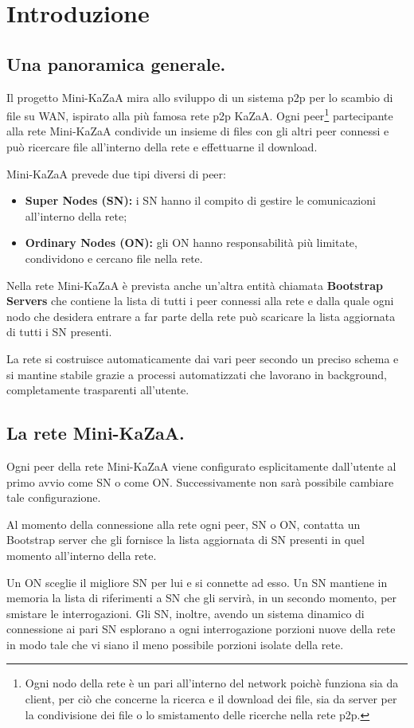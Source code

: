 \chapter{Introduzione}
\section{Una panoramica generale.}
Il progetto Mini-KaZaA mira allo sviluppo di un sistema p2p per lo scambio di file su WAN, ispirato alla più famosa
rete p2p KaZaA.
Ogni peer\footnote{Ogni nodo della rete è un pari all'interno del network poichè funziona sia da client, per ciò che concerne la ricerca e il download dei file, sia da server per la condivisione dei file o lo smistamento delle ricerche nella rete p2p.} partecipante alla rete Mini-KaZaA condivide un insieme di files con gli altri peer connessi e può ricercare file all'interno della rete e effettuarne il download.

Mini-KaZaA prevede due tipi diversi di peer:
\begin{itemize}
 \item \textbf{Super Nodes (SN): }i SN hanno il compito di gestire le comunicazioni all'interno della rete;
 \item \textbf{Ordinary Nodes (ON): }gli ON hanno responsabilità più limitate, condividono e cercano file nella rete.
\end{itemize}

Nella rete Mini-KaZaA è prevista anche un'altra entità chiamata \textbf{Bootstrap Servers} che contiene la lista di tutti i peer connessi alla rete e dalla quale ogni nodo che desidera entrare a far parte della rete può scaricare la lista aggiornata di tutti i SN presenti.

La rete si costruisce automaticamente dai vari peer secondo un preciso schema e si mantine stabile grazie a processi automatizzati che lavorano in background, completamente trasparenti all'utente.

\section{La rete Mini-KaZaA.}
Ogni peer della rete Mini-KaZaA viene configurato esplicitamente dall'utente al primo avvio come SN o come ON. Successivamente non sarà possibile cambiare tale configurazione.

Al momento della connessione alla rete ogni peer, SN o ON, contatta un Bootstrap server che gli fornisce la lista aggiornata di SN presenti in quel momento all'interno della rete.

Un ON sceglie il migliore SN per lui e si connette ad esso. Un SN mantiene in memoria la lista di riferimenti a SN che gli servirà, in un secondo momento, per smistare le interrogazioni. Gli SN, inoltre, avendo un sistema dinamico di connessione ai pari SN esplorano a ogni interrogazione porzioni nuove della rete in modo tale che vi siano il meno possibile porzioni isolate della rete.
